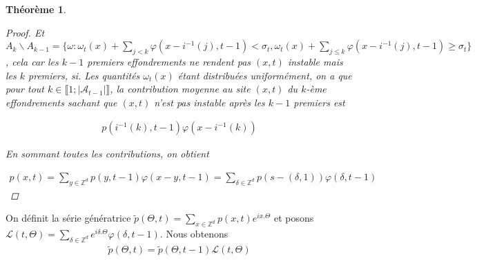 \documentclass{article}
\newtheorem{theorem}{Théorème}[section]
\theoremstyle{definition}
\begin{document}
\begin{theorem}
\begin{proof}
						 Et $A_k\backslash A_{k-1} = \{\omega : \omega_{t}(x)+\sum_{j<k}\varphi(x-i^{-1}(j), t-1)<\sigma_t, \omega_{t}(x)+\sum_{j\leq k}\varphi(x-i^{-1}(j), t-1)\geq \sigma_t\}$, cela car les $k-1$ premiers effondrements ne rendent pas $(x,t)$ instable mais les $k$ premiers, si. Les quantités $\omega_{t}(x)$ étant distribuées uniformément, on a que pour tout $k \in \llbracket1;|\mathcal{A}_{t-1}|\rrbracket$, la contribution moyenne au site $(x,t)$ du $k$-ème effondrements sachant que $(x,t)$ n'est pas instable après les $k-1$ premiers est  

						 \begin{align*}p(i^{-1}(k),t-1)\varphi(x-i^{-1}(k))\end{align*}
					 
						En sommant toutes les contributions, on obtient

						 \begin{align*}
							 p(x,t) = \sum_{y\in \mathbb{Z}^d}p(y, t-1)\varphi(x-y,t-1) = \sum_{\delta\in \mathbb{Z}^d}p(s-(\delta, 1))\varphi(\delta, t-1)
						 \end{align*}
	
					 \end{proof}
\end{theorem}
On définit la série génératrice $\tilde{p}(\Theta, t) = \sum_{x\in \mathbb{Z}^d}p(x,t)e^{i x.\Theta}$ et posons $\mathcal{L}(t,\Theta)= \sum_{\delta\in \mathbb{Z}^d} e^{i\delta.\Theta}\varphi(\delta,t-1)$. Nous obtenons 
\begin{align*}
	\tilde{p}(\Theta, t) = \tilde{p}(\Theta, t-1)\mathcal{L}(t,\Theta)
\end{align*}
\end{document}
